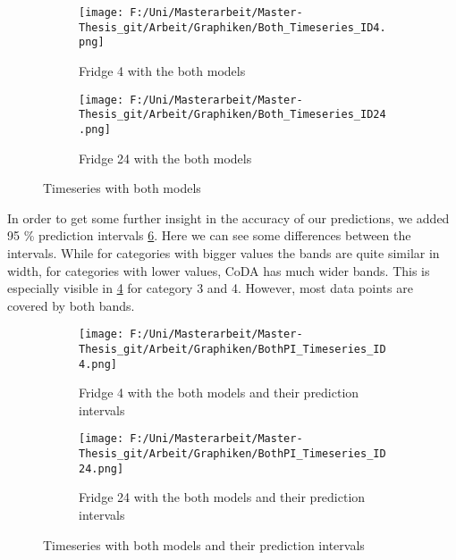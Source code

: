 \begin{figure}[htb]
\centering
\begin{subfigure}[b]{0.8\textwidth}
\texttt{[image: F:/Uni/Masterarbeit/Master-Thesis\_git/Arbeit/Graphiken/Both\_Timeseries\_ID4.png]}
\caption{Fridge 4 with the both models}
\label{fig:Both Fridge 4}
\end{subfigure}
\hfill
\begin{subfigure}[b]{0.8\textwidth}
\texttt{[image: F:/Uni/Masterarbeit/Master-Thesis\_git/Arbeit/Graphiken/Both\_Timeseries\_ID24.png]}
\caption{Fridge 24 with the both models}
\label{fig:Both Fridge 24}
\end{subfigure}
\caption{Timeseries with both models}
\label{fig:TS Both}
\end{figure}


In order to get some further insight in the accuracy of our predictions, we added 95 \% prediction intervals \ref{fig:TS BothPI}. Here we can see some differences between the intervals. While for categories with bigger values the bands are quite similar in width, for categories with lower values, CoDA has much wider bands. This is especially visible in \ref{fig:BothPI Fridge 4} for category 3 and 4. However, most data points are covered by both bands.
\begin{figure}[htb]
\centering
\begin{subfigure}[b]{0.8\textwidth}
\texttt{[image: F:/Uni/Masterarbeit/Master-Thesis\_git/Arbeit/Graphiken/BothPI\_Timeseries\_ID4.png]}
\caption{Fridge 4 with the both models and their prediction intervals}
\label{fig:BothPI Fridge 4}
\end{subfigure}
\hfill
\begin{subfigure}[b]{0.8\textwidth}
\texttt{[image: F:/Uni/Masterarbeit/Master-Thesis\_git/Arbeit/Graphiken/BothPI\_Timeseries\_ID24.png]}
\caption{Fridge 24 with the both models and their prediction intervals}
\label{fig:BothPI Fridge 24}
\end{subfigure}
\caption{Timeseries with both models and their prediction intervals}
\label{fig:TS BothPI}
\end{figure}